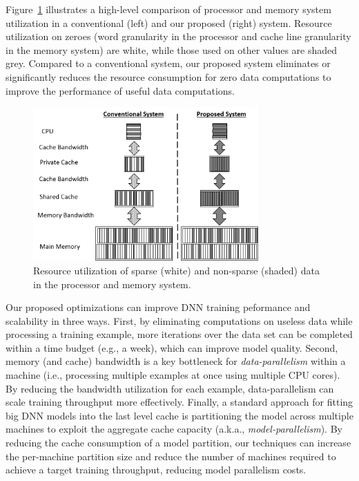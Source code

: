 Figure~\ref{fig:system-compare} illustrates a high-level comparison of processor and memory system utilization in a conventional (left) and our proposed (right) system.  Resource utilization on zeroes (word granularity in the processor and cache line granularity in the memory system) are white, while those used on other values are shaded grey. Compared to a conventional system, our proposed system eliminates or significantly reduces the resource consumption for zero data computations to improve the performance of useful data computations. 

\begin{figure}[!t]
\centering
\includegraphics[width=3.4in]{Figures/system-comparison.png}
\caption{Resource utilization of sparse (white) and non-sparse (shaded) data in the processor and memory system.}
\label{fig:system-compare}
\end{figure}

Our proposed optimizations can improve DNN training peformance and scalability in three ways.  First, by eliminating computations on useless data while processing a training example, more iterations over the data set can be completed within a time budget (e.g., a week), which can improve model quality.  Second,  memory (and cache) bandwidth is a key bottleneck for {\it data-parallelism} within a machine (i.e., processing multiple examples at once using multiple CPU cores). By reducing the bandwidth utilization for each example, data-parallelism can scale training throughput more effectively.  Finally, a standard approach for fitting big DNN models into the last level cache is partitioning the model across multiple machines to exploit the aggregate cache capacity (a.k.a., {\it model-parallelism}). By reducing the cache consumption of a model partition, our techniques can increase the per-machine partition size and reduce the number of machines required to achieve a target training throughput, reducing model parallelism costs. 


